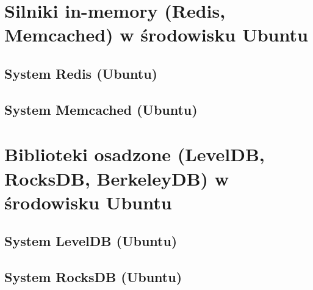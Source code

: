 \section{Silniki in-memory (Redis, Memcached) w środowisku Ubuntu}

\subsection{System Redis (Ubuntu)}





\clearpage

\subsection{System Memcached (Ubuntu)}





\clearpage

\section{Biblioteki osadzone (LevelDB, RocksDB, BerkeleyDB) w środowisku Ubuntu}

\subsection{System LevelDB (Ubuntu)}





\clearpage

\subsection{System RocksDB (Ubuntu)}





\clearpage

